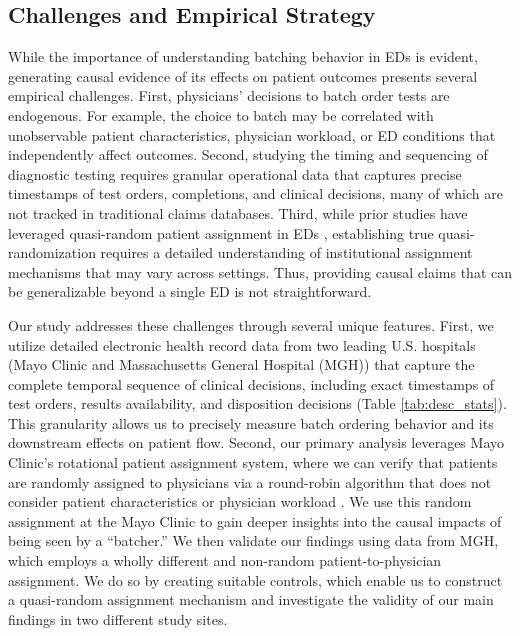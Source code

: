 \documentclass[,,nonblindrev]{informs}
\begin{document}
\subsection{Challenges and Empirical
Strategy}\label{challenges-and-empirical-strategy}

While the importance of understanding batching behavior in EDs is
evident, generating causal evidence of its effects on patient outcomes
presents several empirical challenges. First, physicians' decisions to
batch order tests are endogenous. For example, the choice to batch may
be correlated with unobservable patient characteristics, physician
workload, or ED conditions that independently affect outcomes. Second,
studying the timing and sequencing of diagnostic testing requires
granular operational data that captures precise timestamps of test
orders, completions, and clinical decisions, many of which are not
tracked in traditional claims databases. Third, while prior studies have
leveraged quasi-random patient assignment in EDs
\citep[\citet{Gowrisankaran2022},
\citet{Coussens2024}]{eichmeyer2022pathways}, establishing true
quasi-randomization requires a detailed understanding of institutional
assignment mechanisms that may vary across settings. Thus, providing
causal claims that can be generalizable beyond a single ED is not
straightforward.

Our study addresses these challenges through several unique features.
First, we utilize detailed electronic health record data from two
leading U.S. hospitals (Mayo Clinic and Massachusetts General Hospital
(MGH)) that capture the complete temporal sequence of clinical
decisions, including exact timestamps of test orders, results
availability, and disposition decisions (Table \ref{tab:desc_stats}).
This granularity allows us to precisely measure batch ordering behavior
and its downstream effects on patient flow. Second, our primary analysis
leverages Mayo Clinic's rotational patient assignment system, where we
can verify that patients are randomly assigned to physicians via a
round-robin algorithm that does not consider patient characteristics or
physician workload \citep[\citet{Traub2016}]{traub2016emergency}. We use
this random assignment at the Mayo Clinic to gain deeper insights into
the causal impacts of being seen by a ``batcher.'' We then validate our
findings using data from MGH, which employs a wholly different and
non-random patient-to-physician assignment. We do so by creating
suitable controls, which enable us to construct a quasi-random
assignment mechanism and investigate the validity of our main findings
in two different study sites.
\end{document}
